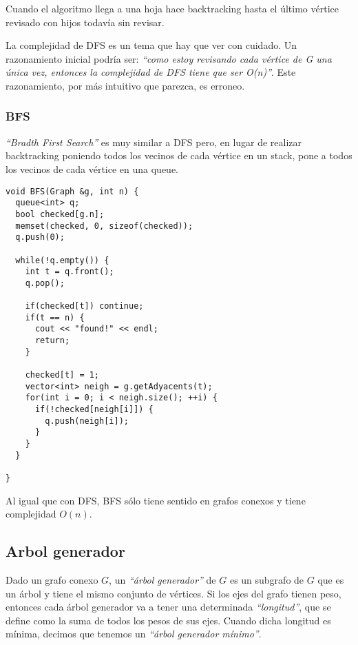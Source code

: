 Cuando el algoritmo llega a una hoja hace backtracking hasta el \'ultimo v\'ertice revisado con hijos todav\'ia sin revisar.

La complejidad de DFS es un tema que hay que ver con cuidado. Un razonamiento inicial podr\'ia ser: \emph{``como estoy revisando cada v\'ertice de G una \'unica vez, entonces la complejidad de DFS tiene que ser O(n)''}. Este razonamiento, por m\'as intuitivo que parezca, es erroneo.



\newpage
\subsubsection{BFS}

\emph{``Bradth First Search''} es muy similar a DFS pero, en lugar de realizar backtracking poniendo todos los vecinos de cada v\'ertice en un stack, pone a todos los vecinos de cada v\'ertice en una queue.
\vspace{8px}

\begin{center}
\begin{minipage}{0.78\textwidth}
\begin{lstlisting}[frame=lrtb]
void BFS(Graph &g, int n) {
  queue<int> q;
  bool checked[g.n];
  memset(checked, 0, sizeof(checked));
  q.push(0);

  while(!q.empty()) {
    int t = q.front();
    q.pop();

    if(checked[t]) continue;
    if(t == n) {
      cout << "found!" << endl;
      return;
    }

    checked[t] = 1;
    vector<int> neigh = g.getAdyacents(t); 
    for(int i = 0; i < neigh.size(); ++i) {
      if(!checked[neigh[i]]) {
        q.push(neigh[i]);
      }
    }
  }

}
\end{lstlisting}
\end{minipage}
\end{center}

Al igual que con DFS, BFS s\'olo tiene sentido en grafos conexos y tiene complejidad $O(n)$.

\newpage
\subsection{Arbol generador}

Dado un grafo conexo $G$, un \emph{``\'arbol generador''} de $G$ es un subgrafo de $G$ que es un \'arbol y tiene el mismo conjunto de v\'ertices. Si los ejes del grafo tienen peso, entonces cada \'arbol generador va a tener una determinada \emph{``longitud''}, que se define como la suma de todos los pesos de sus ejes. Cuando dicha longitud es m\'inima, decimos que tenemos un \emph{``\'arbol generador m\'inimo''}.

